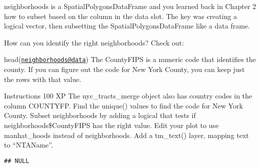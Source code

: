 \documentclass[]{article}
\newenvironment{Shaded}{\begin{snugshade}}{\end{snugshade}}
\newcommand{\CommentTok}[1]{\textcolor[rgb]{0.56,0.35,0.01}{\textit{#1}}}
\newcommand{\DataTypeTok}[1]{\textcolor[rgb]{0.13,0.29,0.53}{#1}}
\newcommand{\KeywordTok}[1]{\textcolor[rgb]{0.13,0.29,0.53}{\textbf{#1}}}
\newcommand{\NormalTok}[1]{#1}
\newcommand{\OperatorTok}[1]{\textcolor[rgb]{0.81,0.36,0.00}{\textbf{#1}}}
\newcommand{\StringTok}[1]{\textcolor[rgb]{0.31,0.60,0.02}{#1}}
\begin{document}
neighborhoods is a SpatialPolygonsDataFrame and you learned back in
Chapter 2 how to subset based on the column in the data slot. The key
was creating a logical vector, then subsetting the
SpatialPolygonsDataFrame like a data frame.

How can you identify the right neighborhoods? Check out:

head(\href{mailto:neighborhoods@data}{\nolinkurl{neighborhoods@data}})
The CountyFIPS is a numeric code that identifies the county. If you can
figure out the code for New York County, you can keep just the rows with
that value.

Instructions 100 XP The nyc\_tracts\_merge object also has country codes
in the column COUNTYFP. Find the unique() values to find the code for
New York County. Subset neighborhoods by adding a logical that tests if
neighborhoods\$CountyFIPS has the right value. Edit your plot to use
manhat\_hoods instead of neighborhoods. Add a tm\_text() layer, mapping
text to ``NTAName''.

\begin{Shaded}
\end{Shaded}

\begin{verbatim}
## NULL
\end{verbatim}

\begin{Shaded}
\end{Shaded}
\end{document}
